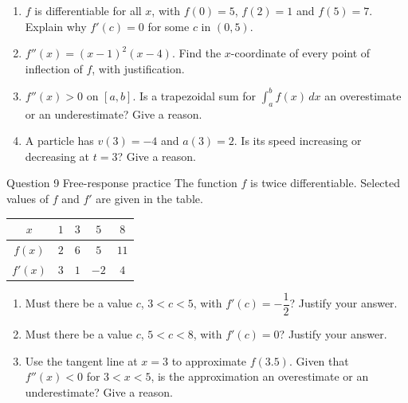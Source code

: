 \documentclass[11pt]{article}
\begin{document}
\begin{enumerate}[leftmargin=*,itemsep=2pt,start=5]
  \item $f$ is differentiable for all $x$, with $f(0)=5$, $f(2)=1$ and $f(5)=7$. Explain why $f'(c)=0$ for some $c$ in $(0,5)$.\work{2.8cm}
  \item $f''(x)=(x-1)^2(x-4)$. Find the $x$-coordinate of every point of inflection of $f$, with justification.\work{2.8cm}
  \item $f''(x)>0$ on $[a,b]$. Is a trapezoidal sum for $\displaystyle\int_{a}^{b}f(x)\,dx$ an overestimate or an underestimate? Give a reason.\work{2.8cm}
  \item A particle has $v(3)=-4$ and $a(3)=2$. Is its speed increasing or decreasing at $t=3$? Give a reason.\work{2.8cm}
\end{enumerate}

\begin{frbox}{Question 9 \textperiodcentered{} Free-response practice}
The function $f$ is twice differentiable. Selected values of $f$ and $f'$ are given in the table.\begin{center}\renewcommand{\arraystretch}{1.25}\begin{tabular}{|c|c|c|c|c|}\hline $x$ & $1$ & $3$ & $5$ & $8$ \\ \hline $f(x)$ & $2$ & $6$ & $5$ & $11$ \\ \hline $f'(x)$ & $3$ & $1$ & $-2$ & $4$ \\ \hline\end{tabular}\end{center}
\begin{enumerate}[label=(\alph*),leftmargin=*,itemsep=2pt]
  \item Must there be a value $c$, $3<c<5$, with $f'(c)=-\dfrac12$? Justify your answer.\work{2.6cm}
  \item Must there be a value $c$, $5<c<8$, with $f'(c)=0$? Justify your answer.\work{2.6cm}
  \item Use the tangent line at $x=3$ to approximate $f(3.5)$. Given that $f''(x)<0$ for $3<x<5$, is the approximation an overestimate or an underestimate? Give a reason.\work{2.6cm}
\end{enumerate}
\end{frbox}
\end{document}
